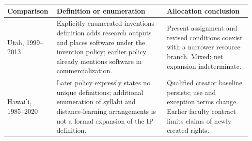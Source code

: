 \begin{tabularx}{\linewidth}{@{}>{\raggedright\arraybackslash}p{.23\linewidth}>{\raggedright\arraybackslash}X>{\raggedright\arraybackslash}X@{}}
\toprule
Comparison & Definition or enumeration & Allocation conclusion \\
\midrule
Utah, 1999--2013 & Explicitly enumerated inventions definition adds research outputs and places software under the invention policy; earlier policy already mentions software in commercialization. & Present assignment and revised conditions coexist with a narrower resource branch. Mixed; net expansion indeterminate. \\
Hawai'i, 1985--2020 & Later policy expressly states no unique definitions; additional enumeration of syllabi and distance-learning arrangements is not a formal expansion of the IP definition. & Qualified creator baseline persists; use and exception terms change. Earlier faculty contract limits claims of newly created rights. \\
\bottomrule
\end{tabularx}
